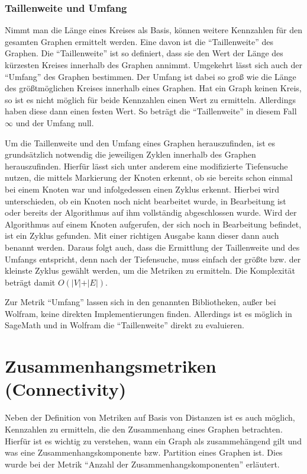 \documentclass[a4paper,12pt,ngerman,chapterprefix=false,listof=totoc,bibliography=totoc]{scrreprt}
\begin{document}
\subsubsection*{Taillenweite und Umfang}
{
Nimmt man die Länge eines Kreises als Basis, können weitere Kennzahlen für den gesamten Graphen ermittelt werden. Eine davon ist die "`Taillenweite"' des Graphen. Die "`Taillenweite"' ist so definiert, dass sie den Wert der Länge des kürzesten Kreises innerhalb des Graphen annimmt. Umgekehrt lässt sich auch der "`Umfang"' des Graphen bestimmen. Der Umfang ist dabei so groß wie die Länge des größtmöglichen Kreises innerhalb eines Graphen. Hat ein Graph keinen Kreis, so ist es nicht möglich für beide Kennzahlen einen Wert zu ermitteln. Allerdings haben diese dann einen festen Wert. So beträgt die "`Taillenweite"' in diesem Fall \(\infty\) und der Umfang null. \cite{diestel_graphentheorie_2000}

Um die Taillenweite und den Umfang eines Graphen herauszufinden, ist es grundsätzlich notwendig die jeweiligen Zyklen innerhalb des Graphen herauszufinden. Hierfür lässt sich unter anderem eine modifizierte Tiefensuche nutzen, die mittels Markierung der Knoten erkennt, ob sie bereits schon einmal bei einem Knoten war und infolgedessen einen Zyklus erkennt. Hierbei wird unterschieden, ob ein Knoten noch nicht bearbeitet wurde, in Bearbeitung ist oder bereits der Algorithmus auf ihm vollständig abgeschlossen wurde. Wird der Algorithmus auf einem Knoten aufgerufen, der sich noch in Bearbeitung befindet, ist ein Zyklus gefunden. Mit einer richtigen Ausgabe kann dieser dann auch benannt werden. Daraus folgt auch, dass die Ermittlung der Taillenweite und des Umfangs entspricht, denn nach der Tiefensuche, muss einfach der größte bzw. der kleinste Zyklus gewählt werden, um die Metriken zu ermitteln. Die Komplexität beträgt damit \(O(\vert V\vert +\vert E\vert)\). \cite{knebl_algorithmen_2019,vocking_taschenbuch_2008}

Zur Metrik "`Umfang"' lassen sich in den genannten Bibliotheken, außer bei Wolfram, keine direkten Implementierungen finden. Allerdings ist es möglich in SageMath und in Wolfram die "`Taillenweite"' direkt zu evaluieren. \cite{sagemath_graph_2020,wolfram_wolfram_2020}
}
\section{Zusammenhangsmetriken (Connectivity)}
{
Neben der Definition von Metriken auf Basis von Distanzen ist es auch möglich, Kennzahlen zu ermitteln, die den Zusammenhang eines Graphen betrachten. Hierfür ist es wichtig zu verstehen, wann ein Graph als zusammehängend gilt und was eine Zusammenhangskomponente bzw. Partition eines Graphen ist. Dies wurde bei der Metrik "`Anzahl der Zusammenhangskomponenten"' erläutert.
}
\end{document}

